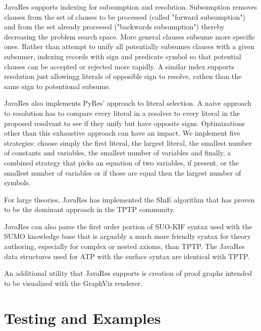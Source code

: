 \documentclass{llncs}
\begin{document}
JavaRes supports indexing for subsumption and resolution.  Subsumption
removes clauses from the set of clauses to be processed (called
"forward subsumption") and from the set already processed ("backwards
subsumption") thereby decreasing the problem search space.  More
general clauses subsume more specific ones.  Rather than attempt to
unify all potentially subsumes clauses with a given subsumer, indexing
records with sign and predicate symbol so that potential clauses can
be accepted or rejected more rapidly.  A similar index supports
resolution just allowingg literals of opposible sign to resolve,
rathen than the same sign to potentional subsume.

JavaRes also implements PyRes' approach to literal selection.  A naive
approach to resolution has to compare every literal in a resolver to
every literal in the proposed resolvant to see if they unify but have
opposite signs.  Optimizations other than this exhaustive approach can
have an impact.  We implement five strategies: choose simply the first
literal, the largest literal, the smallest number of constants and
variables, the smallest number of variables and finally, a combined
strategy that picks an equation of two variables, if present, or the
smallest number of variables or if those are equal then the largest
number of symbols.

For large theories, JavaRes has implemented the SInE algorithm
\cite{HV:CADE-2011} that has proven to be the dominant approach in the
TPTP community.

JavaRes can also parse the first order portion of SUO-KIF syntax used
with the SUMO knowledge base that is arguably a much more friendly
syntax for theory authoring, especially for complex or nested axioms,
than TPTP.  The JavaRes data structures used for ATP with the surface
syntax are identical with TPTP.

An additional utility that JavaRes supports is creation of proof
graphs intended to be visualized with the GraphViz renderer.

\section{Testing and Examples}
\end{document}
